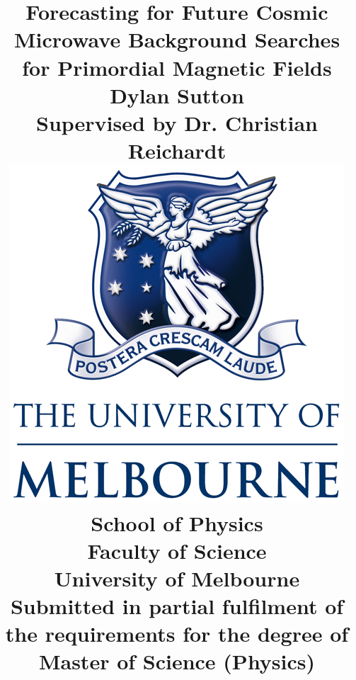 \documentclass[12pt]{article}
\title{
	{Forecasting for Future Cosmic Microwave Background Searches for Primordial Magnetic Fields}
	\\	
	\vspace{1cm}
	\large
	{Dylan Sutton}\\
	{Supervised by Dr. Christian Reichardt}
	\\
	\vspace{1cm}	
	{\includegraphics{UOM.png}}
	\\
	\vspace{2cm}	
	\normalsize
	{School of Physics}\\
	{Faculty of Science}\\
	{University of Melbourne}
	\\
	\vspace{5cm}
	\small
	{Submitted in partial fulfilment of the requirements for the degree of Master of Science (Physics)}
}
\begin{document}
\maketitle
\makeindex
\pagebreak

\pagebreak

\tableofcontents








%

\end{document}
